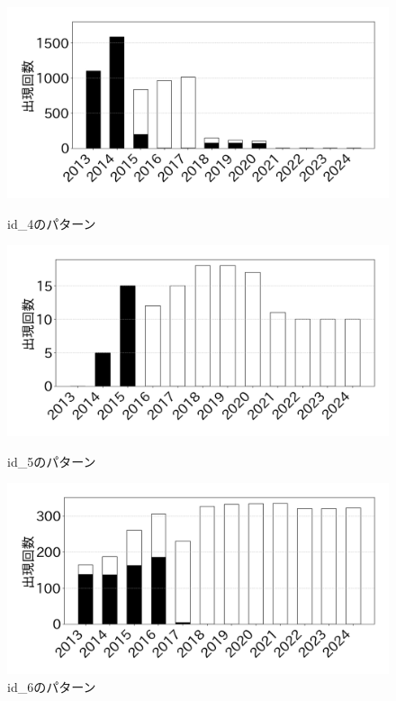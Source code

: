 \documentclass[11pt]{jreport}
\begin{document}
\begin{figure}[h]
        \includegraphics[width=0.9\linewidth]{@BSthesis2024_Noguchi/Noguchi_fig/id_4.png}
        \vspace{-4mm}
        \caption{id\_4のパターン}
        \label{table:id_4}
        
        \includegraphics[width=0.9\linewidth]{@BSthesis2024_Noguchi/Noguchi_fig/id_5.png}
        \vspace{-4mm}
        \caption{id\_5のパターン}
        \label{table:id_5}
        
        \includegraphics[width=0.9\linewidth]{@BSthesis2024_Noguchi/Noguchi_fig/id_6.png}
        \vspace{-4mm}
        \caption{id\_6のパターン}
        \label{table:id_6}
\end{figure}
\end{document}
